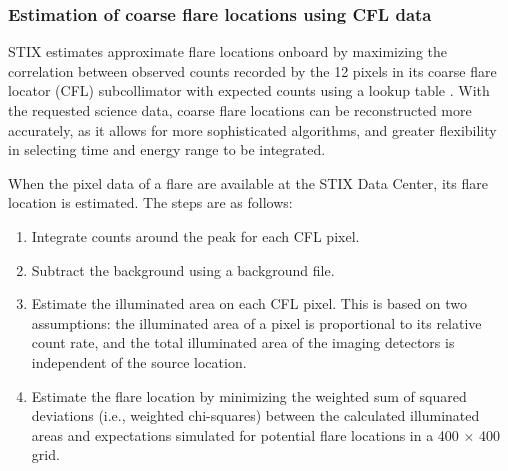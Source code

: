 \documentclass[referee]{aa} %
\begin{document}
\subsubsection{Estimation of coarse flare locations using CFL data}
STIX estimates approximate flare locations onboard by 
maximizing the correlation between observed counts recorded by the 12 pixels in its coarse flare locator (CFL) subcollimator with expected counts using a lookup table \citep{stix2020}. 
With the requested science data, coarse flare locations can be reconstructed more accurately, as it allows for more sophisticated algorithms, and greater flexibility in selecting time and energy range to be integrated. 

When the pixel data of a flare are available at the STIX Data Center, its flare location is estimated. 
The steps are as follows:
\begin{enumerate}
    \item Integrate counts around the peak for each CFL pixel.
    \item Subtract the background using a background file.
    \item Estimate the illuminated area on each CFL pixel.  This is based on two assumptions:  the illuminated area of a pixel is proportional to its relative count rate, and the total illuminated area of the imaging detectors is independent of the source location.
    \item Estimate the flare location by minimizing the weighted sum of squared deviations (i.e., weighted chi-squares) between the calculated illuminated areas and expectations simulated for potential flare locations in a 400 $\times$ 400 grid.
\end{enumerate}
\end{document}
